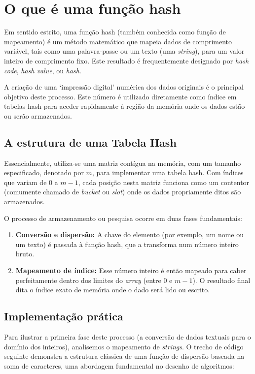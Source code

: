 \documentclass[12pt, a4paper]{article}
\begin{document}
\section{O que é uma função hash}
Em sentido estrito, uma função hash (também conhecida como função de mapeamento)
é um método matemático que mapeia dados de comprimento variável, tais como uma
palavra-passe ou um texto (uma \textit{string}), para um valor inteiro de comprimento fixo. Este
resultado é frequentemente designado por \textit{hash code}, \textit{hash value}, 
ou \textit{hash}.

A criação de uma `impressão digital' numérica dos dados originais é o principal
objetivo deste processo. Este número é utilizado diretamente como índice em tabelas
hash para aceder rapidamente à região da memória onde os dados estão ou serão
armazenados. 

\subsection{A estrutura de uma Tabela Hash}
Essencialmente, utiliza-se uma matriz contígua na memória, com um tamanho
especificado, denotado por $m$, para implementar uma tabela hash. Com índices que variam 
de $0$ a $m-1$, cada posição nesta matriz funciona como um contentor (comumente chamado de \textit{bucket} ou \textit{slot}) 
onde os dados propriamente ditos são armazenados.

O processo de armazenamento ou pesquisa ocorre em duas fases fundamentais:
\begin{enumerate}
    \item \textbf{Conversão e dispersão:} A chave do elemento (por exemplo, um nome ou um texto) é passada à função hash, que a transforma num número inteiro bruto.
    \item \textbf{Mapeamento de índice:} Esse número inteiro é então mapeado para caber perfeitamente dentro dos limites do \textit{array} (entre $0$ e $m-1$). 
    O resultado final dita o índice exato de memória onde o dado será lido ou escrito.
\end{enumerate}

\subsection{Implementação prática}
Para ilustrar a primeira fase deste processo (a conversão de dados textuais para o domínio dos inteiros), analisemos o mapeamento de \textit{strings}. 
O trecho de código seguinte demonstra a estrutura clássica de uma função de dispersão baseada na soma de caracteres, uma abordagem fundamental no desenho de algoritmos:
\end{document}
